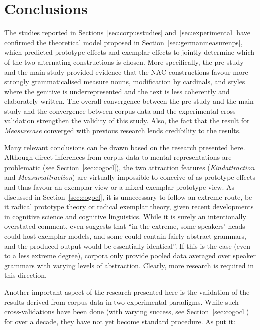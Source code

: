 \section{Conclusions}
\label{sec:conclusion}

The studies reported in Sections~\ref{sec:corpusstudies} and~\ref{sec:experimental} have confirmed the theoretical model proposed in Section~\ref{sec:germanmeasurenps}, which predicted prototype effects and exemplar effects to jointly determine which of the two alternating constructions is chosen.
More specifically, the pre-study and the main study provided evidence that the NAC constructions favour more strongly grammaticalised measure nouns, modification by cardinals, and styles where the genitive is underrepresented and the text is less coherently and elaborately written.
The overall convergence between the pre-study and the main study and the convergence between corpus data and the experimental cross-validation strengthen the validity of this study.
Also, the fact that the result for \textit{Measurecase} converged with previous research \citep{Zimmer2015} lends credibility to the results.

Many relevant conclusions can be drawn based on the research presented here.
Although direct inferences from corpus data to mental representations are problematic (see Section~\ref{sec:cogocl}), the two attraction features (\textit{Kindattraction} and \textit{Measureattraction}) are virtually impossible to conceive of as prototype effects and thus favour an exemplar view or a mixed exemplar-prototype view.
As discussed in Section~\ref{sec:cogocl}, it is unnecessary to follow an extreme route, be it radical prototype theory or radical exemplar theory, given recent developments in cognitive science and cognitive linguistics.
While it is surely an intentionally overstated comment, \citet[15]{Kapatsinski2014} even suggests that ``in the extreme, some speakers’ heads could host exemplar models, and some could contain fairly abstract grammars, and the produced output would be essentially identical''.
If this is the case (even to a less extreme degree), corpora only provide pooled data averaged over speaker grammars with varying levels of abstraction.
Clearly, more research is required in this direction.

Another important aspect of the research presented here is the validation of the results derived from corpus data in two experimental paradigms.
While such cross-validations have been done (with varying success, see Section~\ref{sec:cogocl}) for over a decade, they have not yet become standard procedure.
As \citet[3--4]{DivjakEa2016a} put it:


